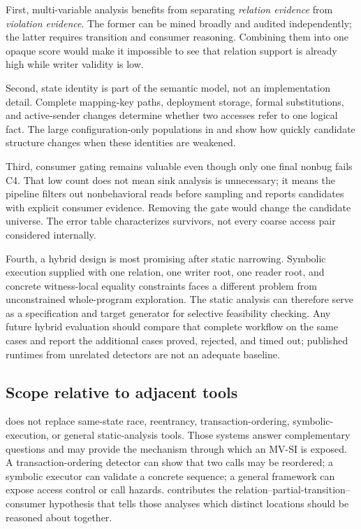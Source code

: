 First, multi-variable analysis benefits from separating \emph{relation evidence} from \emph{violation evidence}. The former can be mined broadly and audited independently; the latter requires transition and consumer reasoning. Combining them into one opaque score would make it impossible to see that relation support is already high while writer validity is low.

Second, state identity is part of the semantic model, not an implementation detail. Complete mapping-key paths, deployment storage, formal substitutions, and active-sender changes determine whether two accesses refer to one logical fact. The large configuration-only populations in  and  show how quickly candidate structure changes when these identities are weakened.

Third, consumer gating remains valuable even though only one final nonbug fails C4. That low count does not mean sink analysis is unnecessary; it means the pipeline filters out nonbehavioral reads before sampling and reports candidates with explicit consumer evidence. Removing the gate would change the candidate universe. The error table characterizes survivors, not every coarse access pair considered internally.

Fourth, a hybrid design is most promising after static narrowing. Symbolic execution supplied with one relation, one writer root, one reader root, and concrete witness-local equality constraints faces a different problem from unconstrained whole-program exploration. The static analysis can therefore serve as a specification and target generator for selective feasibility checking. Any future hybrid evaluation should compare that complete workflow on the same cases and report the additional cases proved, rejected, and timed out; published runtimes from unrelated detectors are not an adequate baseline.

\subsection{Scope relative to adjacent tools}
\label{s:discussion-positioning}

\sys does not replace same-state race, reentrancy, transaction-ordering, symbolic-execution, or general static-analysis tools. Those systems answer complementary questions and may provide the mechanism through which an MV-SI is exposed. A transaction-ordering detector can show that two calls may be reordered; a symbolic executor can validate a concrete sequence; a general framework can expose access control or call hazards. \sys contributes the relation--partial-transition--consumer hypothesis that tells those analyses which distinct locations should be reasoned about together.

